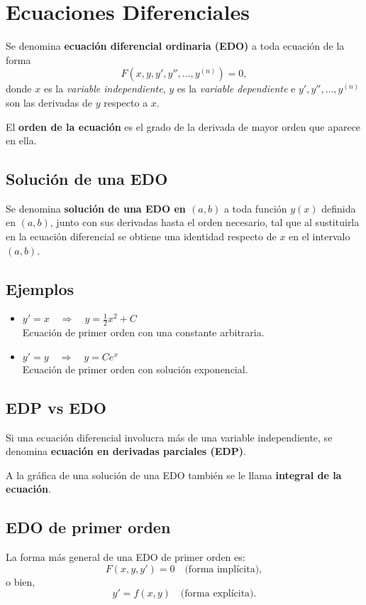 \newpage

\section*{Ecuaciones Diferenciales}

Se denomina \textbf{ecuación diferencial ordinaria (EDO)} a toda ecuación de la forma
\[
    F\left(x, y, y', y'', \dots, y^{(n)}\right) = 0,
\]
donde $x$ es la \textit{variable independiente}, $y$ es la \textit{variable dependiente} e 
$y', y'', \dots, y^{(n)}$ son las derivadas de $y$ respecto a $x$.  

El \textbf{orden de la ecuación} es el grado de la derivada de mayor orden que aparece en ella.  

\subsection*{Solución de una EDO}
Se denomina \textbf{solución de una EDO en $(a,b)$} a toda función $y(x)$ definida en $(a,b)$, 
junto con sus derivadas hasta el orden necesario, tal que al sustituirla en la ecuación diferencial 
se obtiene una identidad respecto de $x$ en el intervalo $(a,b)$.  

\subsection*{Ejemplos}
\begin{itemize}
    \item $y' = x \quad \Rightarrow \quad y = \tfrac{1}{2}x^2 + C$ \\
    Ecuación de primer orden con una constante arbitraria.
    
    \item $y' = y \quad \Rightarrow \quad y = Ce^{x}$ \\
    Ecuación de primer orden con solución exponencial.
\end{itemize}

\subsection*{EDP vs EDO}
Si una ecuación diferencial involucra más de una variable independiente, se denomina 
\textbf{ecuación en derivadas parciales (EDP)}.  

A la gráfica de una solución de una EDO también se le llama \textbf{integral de la ecuación}.  

\subsection*{EDO de primer orden}
La forma más general de una EDO de primer orden es:
\[
    F(x, y, y') = 0 \quad \text{(forma implícita)},
\]
o bien,
\[
    y' = f(x,y) \quad \text{(forma explícita)}.
\]

